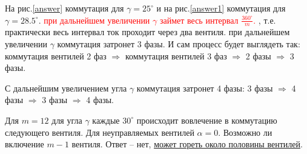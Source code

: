 \documentclass{article}
\begin{document}
На рис.\ref{answer} коммутация для $\gamma=25^\circ$ и на рис.\ref{answer1} коммутация для $\gamma=28.5^\circ$.
 \textcolor{red}{ при дальнейшем увеличении $\gamma$ займет весь интервал $\frac{360^\circ}{m}$. }, т.е. практически весь интервал ток проходит через два вентиля.
 при дальнейшем увеличении $\gamma$ коммутация затронет 3 фазы. И сам процесс будет выглядеть так: коммутация вентилей 2 фаз $\Rightarrow$ коммутация вентилей 3 фаз $\Rightarrow$ 2 фазы $\Rightarrow$ 3 фазы.

 С дальнейшим увеличением угла $\gamma$ коммутация затронет 4 фазы: 3 фазы $\Rightarrow$ 4 фазы $\Rightarrow$ 3 фазы $\Rightarrow$ 4 фазы.

 Для $m=12$ для угла $\gamma$ каждые $30^\circ$ происходит вовлечение в коммутацию следующего вентиля. Для неуправляемых вентилей $\alpha=0$. Возможно ли включение $m-1$ вентиля. Ответ -- нет,
 \href{http://e-heritage.ru/ras/view/publication/general.html?id=48315927}{может гореть около половины вентилей}. 
 
\end{document}
